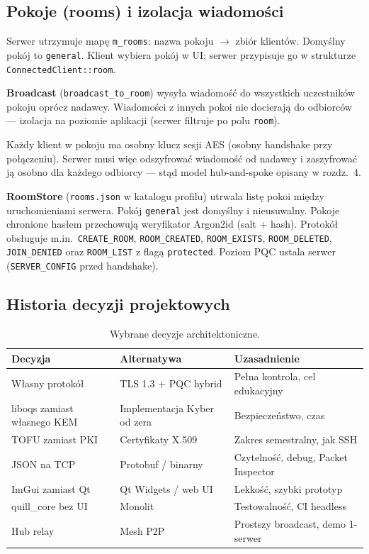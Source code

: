 \documentclass[12pt,a4paper]{article}
\begin{document}
\subsection{Pokoje (rooms) i izolacja wiadomości}

Serwer utrzymuje mapę \texttt{m\_rooms}: nazwa pokoju $\rightarrow$ zbiór klientów. Domyślny pokój to \texttt{general}. Klient wybiera pokój w UI; serwer przypisuje go w strukturze \texttt{ConnectedClient::room}.

\textbf{Broadcast} (\texttt{broadcast\_to\_room}) wysyła wiadomość do wszystkich uczestników pokoju oprócz nadawcy. Wiadomości z innych pokoi nie docierają do odbiorców --- izolacja na poziomie aplikacji (serwer filtruje po polu \texttt{room}).

Każdy klient w pokoju ma osobny klucz sesji AES (osobny handshake przy połączeniu). Serwer musi więc odszyfrować wiadomość od nadawcy i zaszyfrować ją osobno dla każdego odbiorcy --- stąd model hub-and-spoke opisany w rozdz.~4.

\textbf{RoomStore} (\texttt{rooms.json} w katalogu profilu) utrwala listę pokoi między uruchomieniami serwera. Pokój \texttt{general} jest domyślny i nieusuwalny. Pokoje chronione hasłem przechowują weryfikator Argon2id (salt + hash). Protokół obsługuje m.in.\ \texttt{CREATE\_ROOM}, \texttt{ROOM\_CREATED}, \texttt{ROOM\_EXISTS}, \texttt{ROOM\_DELETED}, \texttt{JOIN\_DENIED} oraz \texttt{ROOM\_LIST} z flagą \texttt{protected}. Poziom PQC ustala serwer (\texttt{SERVER\_CONFIG} przed handshake).

\subsection{Historia decyzji projektowych}

\begin{table}[H]
\centering
\small
\begin{tabular}{@{}p{4cm}p{4cm}p{5.5cm}@{}}
\toprule
\textbf{Decyzja} & \textbf{Alternatywa} & \textbf{Uzasadnienie} \\
\midrule
Własny protokół & TLS 1.3 + PQC hybrid & Pełna kontrola, cel edukacyjny \\
liboqs zamiast własnego KEM & Implementacja Kyber od zera & Bezpieczeństwo, czas \\
TOFU zamiast PKI & Certyfikaty X.509 & Zakres semestralny, jak SSH \\
JSON na TCP & Protobuf / binarny & Czytelność, debug, Packet Inspector \\
ImGui zamiast Qt & Qt Widgets / web UI & Lekkość, szybki prototyp \\
quill\_core bez UI & Monolit & Testowalność, CI headless \\
Hub relay & Mesh P2P & Prostszy broadcast, demo 1-serwer \\
\bottomrule
\end{tabular}
\caption{Wybrane decyzje architektoniczne.}
\end{table}
\end{document}
